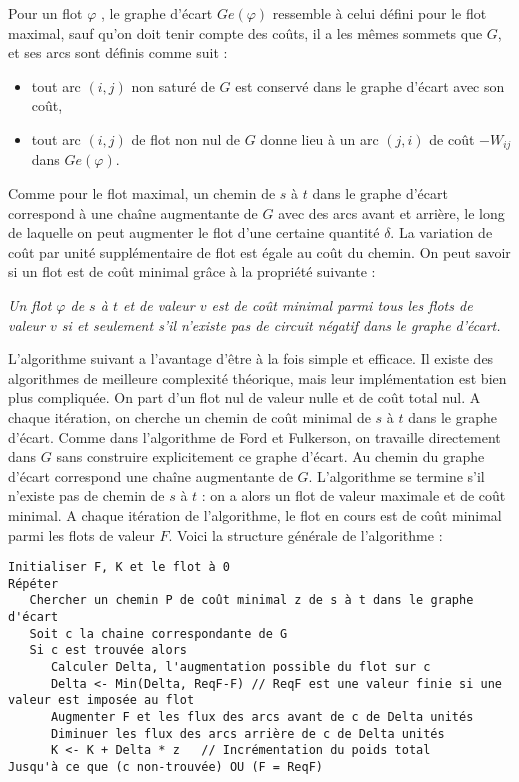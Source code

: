 \documentclass{article}
\begin{document}
\noindent Pour un flot $\varphi$ , le graphe d’écart $Ge(\varphi)$ ressemble à celui défini pour le flot maximal, sauf qu’on doit tenir compte des coûts, il a les mêmes sommets que 
$G$, et ses arcs sont définis comme suit :\begin{itemize}
\item tout arc $(i,j)$ non saturé de $G$ est conservé dans le graphe d’écart avec son coût,
\item tout arc $(i,j)$ de flot non nul de $G$ donne lieu à un arc $(j,i)$ de coût $-W_{ij}$ dans $Ge(\varphi)$.
\end{itemize}
Comme pour le flot maximal, un chemin de $s$ à $t$ dans le graphe d’écart correspond à une chaîne augmentante de $G$ avec des arcs avant et arrière, le long de laquelle on peut 
augmenter le flot d’une certaine quantité $\delta$. La variation de coût par unité supplémentaire de flot est égale au coût du chemin. On peut savoir si un flot est de coût minimal 
grâce à la propriété suivante : \begin{center}\textit{Un flot $\varphi$ de $s$ à $t$ et de valeur $v$ est de coût minimal parmi tous les flots de valeur $v$ si et seulement s’il 
n’existe pas de circuit négatif dans le graphe d’écart.}\end{center}

L’algorithme suivant a l’avantage d’être à la fois simple et efficace. Il existe des algorithmes de meilleure complexité théorique, mais leur implémentation est bien plus compliquée.
On part d’un flot nul de valeur nulle et de coût total nul. A chaque itération, on cherche un chemin de coût minimal de $s$ à $t$ dans le graphe d’écart. Comme dans l’algorithme de 
Ford et Fulkerson, on travaille directement dans $G$ sans construire explicitement ce graphe d’écart. Au chemin du graphe d’écart correspond une chaîne augmentante de $G$. 
L’algorithme se termine s’il n’existe pas de chemin de $s$ à $t$ : on a alors un flot de valeur maximale et de coût minimal. A chaque itération de l’algorithme, le flot en cours est de 
coût minimal parmi les flots de valeur $F$. Voici la structure générale de l'algorithme : 
\newpage
\begin{verbatim}
Initialiser F, K et le flot à 0
Répéter
   Chercher un chemin P de coût minimal z de s à t dans le graphe d'écart
   Soit c la chaine correspondante de G
   Si c est trouvée alors
      Calculer Delta, l'augmentation possible du flot sur c
      Delta <- Min(Delta, ReqF-F) // ReqF est une valeur finie si une valeur est imposée au flot
      Augmenter F et les flux des arcs avant de c de Delta unités
      Diminuer les flux des arcs arrière de c de Delta unités
      K <- K + Delta * z   // Incrémentation du poids total
Jusqu'à ce que (c non-trouvée) OU (F = ReqF)
\end{verbatim}
\end{document}
